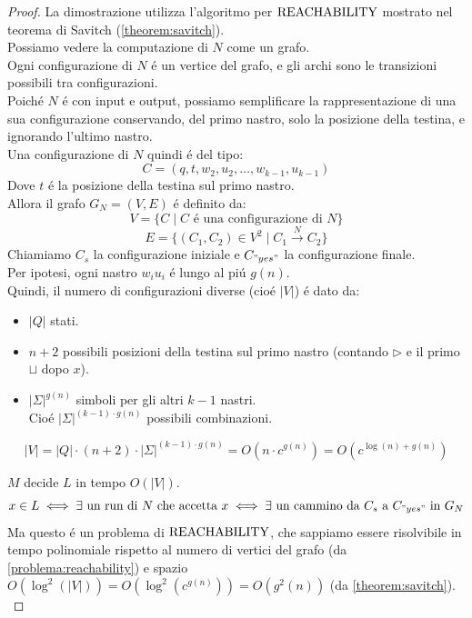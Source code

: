 \begin{proof}
La dimostrazione utilizza l'algoritmo per $\text{REACHABILITY}$ mostrato nel teorema di Savitch (\ref{theorem:savitch}). \\
Possiamo vedere la computazione di $N$ come un grafo. \\
Ogni configurazione di $N$ é un vertice del grafo, 
e gli archi sono le transizioni possibili tra configurazioni. \\

Poiché $N$ é con input e output, 
possiamo semplificare la rappresentazione di una sua configurazione
conservando, del primo nastro, solo la posizione della testina,
e ignorando l'ultimo nastro. \\
Una configurazione di $N$ quindi é del tipo:
\[
C = (q, t, w_2, u_2, \dots, w_{k-1}, u_{k-1})
\]
Dove $t$ é la posizione della testina sul primo nastro. \\

Allora il grafo $G_N = (V, E)$ é definito da:
\[
V = \{C \mid C \text{ é una configurazione di } N\}
\]
\[
E = \{(C_1, C_2) \in V^2 \mid C_1 \xrightarrow{N} C_2\}
\]
Chiamiamo $C_s$ la configurazione iniziale e $C_{"yes"}$ la configurazione finale. \\

Per ipotesi, ogni nastro $w_i u_i$ é lungo al piú $g(n)$. \\
Quindi, il numero di configurazioni diverse (cioé $|V|$) é dato da:
\begin{itemize}
	\item $|Q|$ stati.
	\item $n+2$ possibili posizioni della testina sul primo nastro (contando $\triangleright$ e il primo $\sqcup$ dopo $x$).
	\item $|\Sigma|^{g(n)}$ simboli per gli altri $k-1$ nastri. \\ 
	Cioé $|\Sigma|^{(k-1) \cdot g(n)}$ possibili combinazioni. \\
\end{itemize}
\[
|V| = |Q| \cdot (n+2) \cdot |\Sigma|^{(k-1) \cdot g(n)} = O(n \cdot c^{g(n)}) = O(c^{\log(n) + g(n)})
\]

$M$ decide $L$ in tempo $O(|V|)$. \\
\[
x \in L \iff \exists \text{ un run di } N \text{ che accetta } x \iff \exists \text{ un cammino da } C_s \text{ a } C_{"yes"} \text{ in } G_N
\]
Ma questo é un problema di $\text{REACHABILITY}$, che sappiamo essere risolvibile in tempo polinomiale rispetto al numero di vertici del grafo (da \ref{problema:reachability}) 
e spazio $O(\log^2(|V|)) = O(\log^2 (c^{g(n)})) = O(g^2(n))$ (da \ref{theorem:savitch}). \\


\end{proof}
